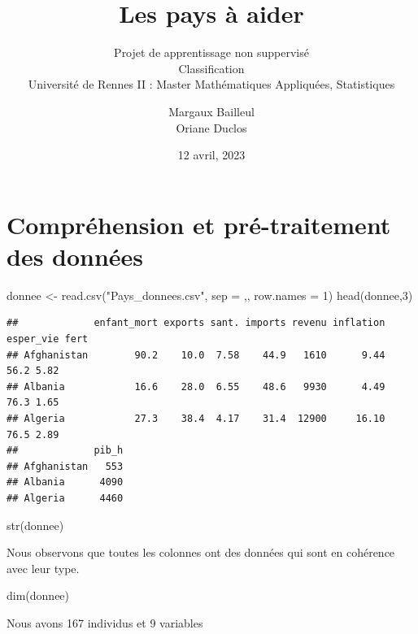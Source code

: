 \documentclass[
]{article}
\title{Les pays à aider}
\subtitle{Projet de apprentissage non suppervisé\\
Classification\\
Université de Rennes II : Master Mathématiques Appliquées, Statistiques}
\author{Margaux Bailleul\\
Oriane Duclos}
\date{12 avril, 2023}
\newenvironment{Shaded}{}{}
\newcommand{\AttributeTok}[1]{#1}
\newcommand{\DecValTok}[1]{#1}
\newcommand{\FunctionTok}[1]{#1}
\newcommand{\NormalTok}[1]{#1}
\newcommand{\OtherTok}[1]{\textcolor[rgb]{1.00,0.25,0.00}{#1}}
\newcommand{\StringTok}[1]{\textcolor[rgb]{0.00,0.50,0.50}{#1}}
\begin{document}
\maketitle

{
\setcounter{tocdepth}{2}
\tableofcontents
}
\hypertarget{compruxe9hension-et-pruxe9-traitement-des-donnuxe9es}{%
\section{Compréhension et pré-traitement des
données}\label{compruxe9hension-et-pruxe9-traitement-des-donnuxe9es}}

\begin{Shaded}
\begin{Highlighting}[]
\NormalTok{donnee }\OtherTok{\textless{}{-}} \FunctionTok{read.csv}\NormalTok{(}\StringTok{"Pays\_donnees.csv"}\NormalTok{, }\AttributeTok{sep =} \StringTok{\textquotesingle{},\textquotesingle{}}\NormalTok{, }\AttributeTok{row.names =} \DecValTok{1}\NormalTok{)}
\FunctionTok{head}\NormalTok{(donnee,}\DecValTok{3}\NormalTok{)}
\end{Highlighting}
\end{Shaded}

\begin{verbatim}
##             enfant_mort exports sant. imports revenu inflation esper_vie fert
## Afghanistan        90.2    10.0  7.58    44.9   1610      9.44      56.2 5.82
## Albania            16.6    28.0  6.55    48.6   9930      4.49      76.3 1.65
## Algeria            27.3    38.4  4.17    31.4  12900     16.10      76.5 2.89
##             pib_h
## Afghanistan   553
## Albania      4090
## Algeria      4460
\end{verbatim}

\begin{Shaded}
\begin{Highlighting}[]
\FunctionTok{str}\NormalTok{(donnee)}
\end{Highlighting}
\end{Shaded}

Nous observons que toutes les colonnes ont des données qui sont en
cohérence avec leur type.

\begin{Shaded}
\begin{Highlighting}[]
\FunctionTok{dim}\NormalTok{(donnee)}
\end{Highlighting}
\end{Shaded}

Nous avons 167 individus et 9 variables
\end{document}
